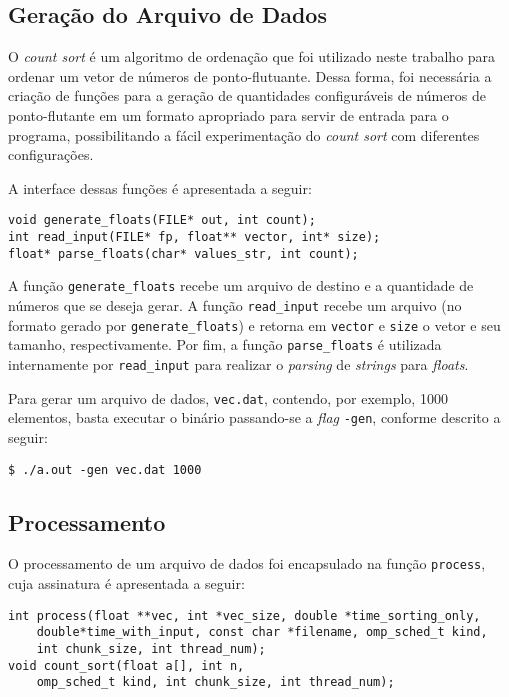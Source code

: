 \documentclass[12pt,a4paper]{article}
\begin{document}
\subsection{Geração do Arquivo de Dados}
\label{sec:data-gen}
O \textit{count sort} é um algoritmo de ordenação que foi utilizado neste
trabalho para ordenar um vetor de números de ponto-flutuante. Dessa forma, foi
necessária a criação de funções para a geração de quantidades configuráveis de
números de ponto-flutante em um formato apropriado para servir de entrada para o
programa, possibilitando a fácil experimentação do \textit{count sort} com
diferentes configurações.

A interface dessas funções é apresentada a seguir:

\begin{verbatim}
void generate_floats(FILE* out, int count);
int read_input(FILE* fp, float** vector, int* size);
float* parse_floats(char* values_str, int count);
\end{verbatim}

A função \texttt{generate\_floats} recebe um arquivo de destino e a quantidade de
números que se deseja gerar. A função \texttt{read\_input} recebe um arquivo (no
formato gerado por \texttt{generate\_floats}) e retorna em \texttt{vector} e
\texttt{size} o vetor e seu tamanho, respectivamente. Por fim, a função
\texttt{parse\_floats} é utilizada internamente por \texttt{read\_input} para
realizar o \textit{parsing} de \textit{strings} para \textit{floats}.

Para gerar um arquivo de dados, \texttt{vec.dat}, contendo, por exemplo, 1000
elementos, basta executar o binário passando-se a \textit{flag} \texttt{-gen},
conforme descrito a seguir:

\begin{verbatim}
$ ./a.out -gen vec.dat 1000
\end{verbatim}

\subsection{Processamento}
O processamento de um arquivo de dados foi encapsulado na função
\texttt{process}, cuja assinatura é apresentada a seguir:

\begin{verbatim}
int process(float **vec, int *vec_size, double *time_sorting_only,
    double*time_with_input, const char *filename, omp_sched_t kind,
    int chunk_size, int thread_num);
void count_sort(float a[], int n,
    omp_sched_t kind, int chunk_size, int thread_num);
\end{verbatim}
\end{document}

